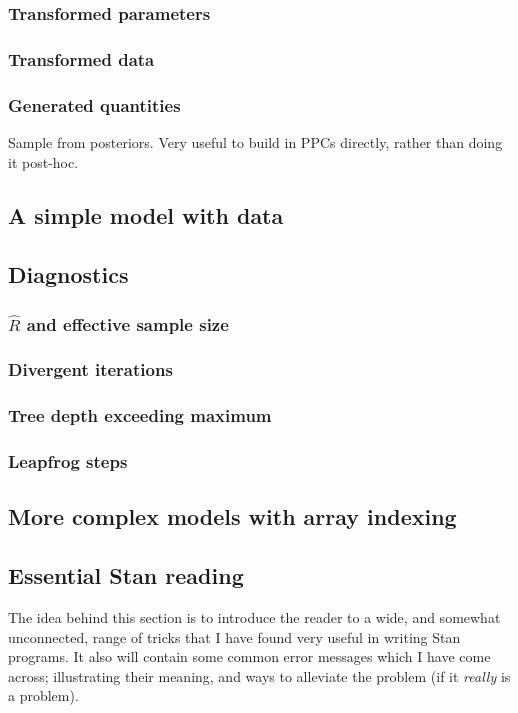 \documentclass[11pt,fullpage]{book}
\begin{document}
\subsubsection{Transformed parameters}
\subsubsection{Transformed data}
\subsubsection{Generated quantities}
Sample from posteriors. Very useful to build in PPCs directly, rather than doing it post-hoc.

\subsection{A simple model with data}

\subsection{Diagnostics}
\subsubsection{$\hat{R}$ and effective sample size}
\subsubsection{Divergent iterations}
\subsubsection{Tree depth exceeding maximum}
\subsubsection{Leapfrog steps}

\subsection{More complex models with array indexing}

\subsection{Essential Stan reading}
The idea behind this section is to introduce the reader to a wide, and somewhat unconnected, range of tricks that I have found very useful in writing Stan programs. It also will contain some common error messages which I have come across; illustrating their meaning, and ways to alleviate the problem (if it \textit{really} is a problem).
\end{document}
